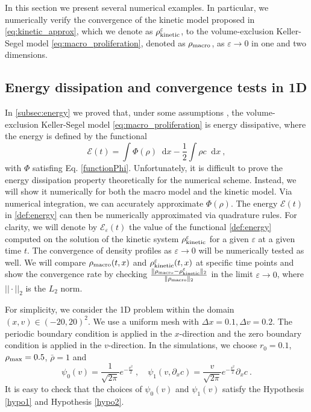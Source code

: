 \documentclass[review,onefignum,onetabnum]{siamart220329}
\newcommand {\e}  {\varepsilon}
\newcommand {\p}   {\partial}
\newcommand*\diff{\mathop{}\!\mathrm{d}}
\begin{document}
In this section we present several numerical examples.
In particular, we {numerically verify} the convergence of the kinetic model proposed in \cref{eq:kinetic_approx}, which we denote as $\rho_\textnormal{kinetic}^\e$, to the volume-exclusion Keller-Segel model \cref{eq:macro_proliferation}, denoted as $\rho_\textnormal{macro}$, as $\varepsilon\to 0$ in one and two dimensions. 
\subsection{Energy dissipation and convergence tests in 1D}\label{subsec:energy_dissipation}
In \cref{subsec:energy} we proved that, under some assumptions \cite{calvez2006volume,carrillo2001entropy,de2018energy}, the volume-exclusion Keller-Segel model \cref{eq:macro_proliferation} is energy dissipative, 
{where the energy is defined by the functional
\begin{equation}\label{def:energy}
    \mathcal{E}(t)=\int\Phi(\rho)\diff x-\frac{1}{2}\int\rho c\diff x\ ,    
\end{equation}
\noindent with $ \Phi $ satisfing Eq. \cref{functionPhi}. 
{ Unfortunately, it is difficult to prove the energy dissipation property theoretically for the numerical scheme. 
Instead, we will show it numerically for both the macro model and the kinetic model. 
}
{Via numerical integration, we can accurately approximate $\Phi(\rho)$. The energy $\mathcal{E}(t)$ in \cref{def:energy} can then be numerically approximated via quadrature rules.} 
For clarity, we will denote by $\mathcal{E}_\e(t)$ the value of the functional \cref{def:energy} computed on the solution of the kinetic system $\rho_\textnormal{kinetic}^\e$ for a given $\e$ at a given time $t$. } 
The convergence of density profiles as $\varepsilon\to0$ will be numerically tested as well. 
We will compare $\rho_\textnormal{macro}(t,x)$ and $\rho_\textnormal{kinetic}^{\varepsilon}(t,x)$ at specific time points and show the convergence rate by checking $\frac{\|\rho_\textnormal{macro}-\rho_\textnormal{kinetic}^{\varepsilon}\|_2}{\| \rho_\textnormal{macro}\|_2}$ in the limit $\varepsilon\to0$, where $||\cdot||_2$ is the $L_2$ norm.

For simplicity, we consider the 1D problem  within the domain $(x, v) \in (-20,20)^2$. 
We use a uniform mesh with {$\Delta x = 0.1, \Delta v = 0.2$}. 
The periodic boundary condition is applied in the $x$-direction and the zero boundary condition is applied in the $v$-direction. 
In the simulations, we choose  $r_0=0.1$, $\rho_{\rm max} = 0.5$, $\bar{\rho} = 1$ and 
\begin{equation}\label{def:psi01}
    \psi_0(v) = \frac{1}{\sqrt{2\pi}}e^{-\frac{v^2}{2}}\ , \quad \psi_1(v, {{\p_x c}}) = \frac{v}{\sqrt{2\pi}}e^{-\frac{v^2}{2}} {\p_x c}\ .
\end{equation}
{It is easy to check that the choices of $\psi_0(v)$ and $\psi_1(v)$ satisfy the Hypothesis \cref{hypo1} and Hypothesis  \cref{hypo2}.}
\end{document}

